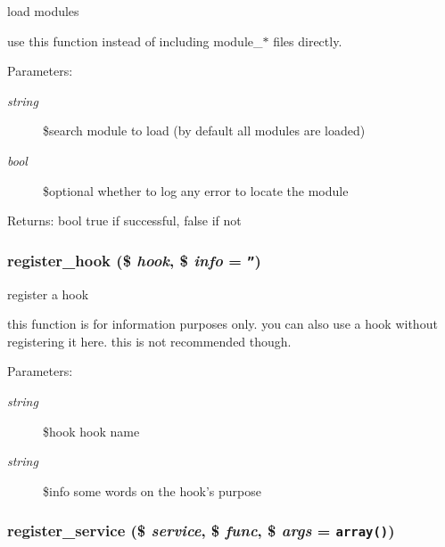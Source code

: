 load modules

use this function instead of including module\_\-$\ast$ files directly. \begin{Desc}
\item[Parameters:]
\begin{description}
\item[{\em string}]\$search module to load (by default all modules are loaded) \item[{\em bool}]\$optional whether to log any error to locate the module \end{description}
\end{Desc}
\begin{Desc}
\item[Returns:]bool true if successful, false if not \end{Desc}
\hypertarget{modules_8inc_8php_d91a5f96df0655d782404170324e567d}{
\subsubsection[{register\_\-hook}]{\setlength{\rightskip}{0pt plus 5cm}register\_\-hook (\$ {\em hook}, \/  \$ {\em info} = {\tt ''})}}
\label{modules_8inc_8php_d91a5f96df0655d782404170324e567d}


register a hook

this function is for information purposes only. you can also use a hook without registering it here. this is not recommended though. \begin{Desc}
\item[Parameters:]
\begin{description}
\item[{\em string}]\$hook hook name \item[{\em string}]\$info some words on the hook's purpose \end{description}
\end{Desc}
\hypertarget{modules_8inc_8php_e6ed600fb2ce39a4b0837bbb01fe8d6e}{
\subsubsection[{register\_\-service}]{\setlength{\rightskip}{0pt plus 5cm}register\_\-service (\$ {\em service}, \/  \$ {\em func}, \/  \$ {\em args} = {\tt array()})}}
\label{modules_8inc_8php_e6ed600fb2ce39a4b0837bbb01fe8d6e}


